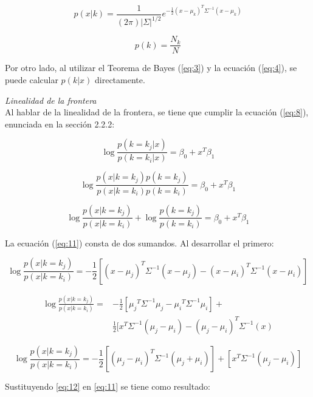 \begin{equation} \label{eq:9}
 p(x|k) = \frac{1}{(2\pi) |\Sigma|^{1/2}} e^{-\frac{1}{2}(x-\mu_{k})^{T}\Sigma^{-1}(x-\mu_{k})}
\end{equation}

\begin{equation} \label{eq:10}
 p(k) = \frac{N_k}{N}	
\end{equation}

Por otro lado, al utilizar el Teorema de Bayes (\ref{eq:3}) y la ecuación (\ref{eq:4}), se puede calcular $p(k|x)$ directamente. 



\textit{Linealidad de la frontera}\\
Al hablar de la linealidad de la frontera, se tiene que cumplir la ecuación (\ref{eq:8}), enunciada en la sección 2.2.2:

$$\log \frac{p(k = k_j | x )}{p(k = k_i |  x)} = \beta_0 +  x^T \beta_1$$

$$\log \frac{p(x | k = k_j)p(k = k_j)}{p( x | k = k_i)p(k = k_i)} = \beta_0 +  x^T \beta_1$$

\begin{equation} \label{eq:11}
 	\log\frac{p(x | k = k_j)}{p(x | k = k_i)} + \log\frac{p(k = k_j)}{p(k = k_i)} = \beta_0 +  x^T \beta_1
\end{equation} 

La ecuación (\ref{eq:11}) consta de dos sumandos. Al desarrollar el primero:

$$ \log\frac{p(x | k = k_j)}{p(x | k = k_i)} = -\frac{1}{2}[(x - \mu_j)^T \Sigma^{-1}(x - \mu_j) - (x - \mu_i)^T \Sigma^{-1}(x - \mu_i)] $$ 


\begin{equation}
\begin{aligned}
 \log\frac{p(x | k = k_j)}{p(x | k = k_i)} =& -\frac{1}{2}[{\mu_j}^T \Sigma^{-1} {\mu_j}  -  {\mu_i}^T \Sigma^{-1} {\mu_i}]  + \\
 &\frac{1}{2}[{x}^T \Sigma^{-1}(\mu_j-\mu_i) - {(\mu_j-\mu_i)}^T \Sigma^{-1}(x)
\end{aligned}
\end{equation}

 

 \begin{equation} \label{eq:12}
 	\log\frac{p(x| k = k_j)}{p(x | k = k_i)} = -\frac{1}{2}[{(\mu_j - \mu_i)}^T \Sigma^{-1} {(\mu_j + \mu_i)}] + [{x}^T \Sigma^{-1}(\mu_j-\mu_i)]
 \end{equation}

Sustituyendo \ref{eq:12} en \ref{eq:11} se tiene como resultado:

